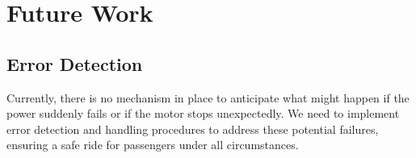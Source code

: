 \documentclass[12pt, a4paper]{report}
\begin{document}
\chapter{Future Work}

\section{Error Detection}

Currently, there is no mechanism in place to anticipate what might happen if the power suddenly fails or if the motor stops unexpectedly. We need to implement error detection and handling procedures to address these potential failures, ensuring a safe ride for passengers under all circumstances.
\end{document}
